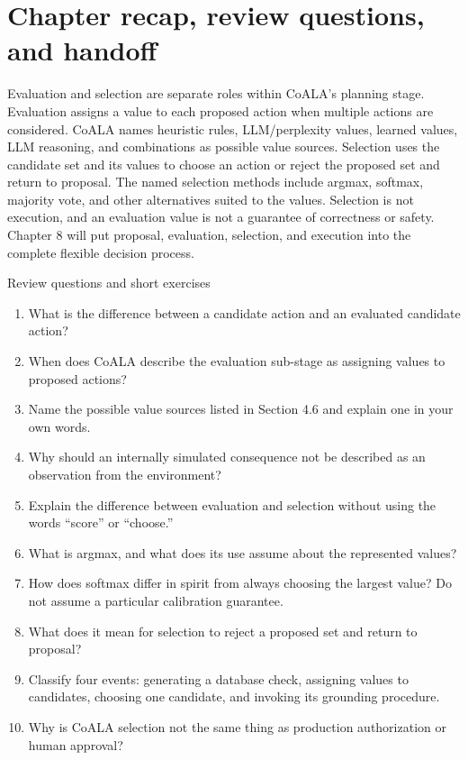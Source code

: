 \section{Chapter recap, review questions, and handoff}
\begin{chapterrecap}
Evaluation and selection are separate roles within CoALA's planning stage. Evaluation assigns a value to each proposed action when multiple actions are considered. CoALA names heuristic rules, LLM/perplexity values, learned values, LLM reasoning, and combinations as possible value sources. Selection uses the candidate set and its values to choose an action or reject the proposed set and return to proposal. The named selection methods include argmax, softmax, majority vote, and other alternatives suited to the values. Selection is not execution, and an evaluation value is not a guarantee of correctness or safety. Chapter 8 will put proposal, evaluation, selection, and execution into the complete flexible decision process.
\end{chapterrecap}
\begin{reviewquestions}{Review questions and short exercises}
\begin{enumerate}
  \item What is the difference between a candidate action and an evaluated candidate action?
  \item When does CoALA describe the evaluation sub-stage as assigning values to proposed actions?
  \item Name the possible value sources listed in Section 4.6 and explain one in your own words.
  \item Why should an internally simulated consequence not be described as an observation from the environment?
  \item Explain the difference between evaluation and selection without using the words ``score'' or ``choose.''
  \item What is argmax, and what does its use assume about the represented values?
  \item How does softmax differ in spirit from always choosing the largest value? Do not assume a particular calibration guarantee.
  \item What does it mean for selection to reject a proposed set and return to proposal?
  \item Classify four events: generating a database check, assigning values to candidates, choosing one candidate, and invoking its grounding procedure.
  \item Why is CoALA selection not the same thing as production authorization or human approval?
\end{enumerate}
\end{reviewquestions}

